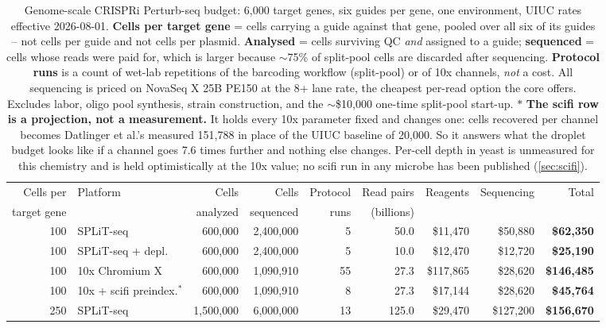 \begin{table}[htbp]\centering
\footnotesize
\caption[]{Genome-scale CRISPRi Perturb-seq budget: 6{,}000 target genes, six guides per gene, one environment, UIUC rates effective 2026-08-01. \textbf{Cells per target gene} = cells carrying a guide against that gene, pooled over all six of its guides -- not cells per guide and not cells per plasmid. \textbf{Analysed} = cells surviving QC \emph{and} assigned to a guide; \textbf{sequenced} = cells whose reads were paid for, which is larger because $\sim$75\% of split-pool cells are discarded after sequencing. \textbf{Protocol runs} is a count of wet-lab repetitions of the barcoding workflow (split-pool) or of 10x channels, \emph{not} a cost. All sequencing is priced on NovaSeq X 25B PE150 at the 8+ lane rate, the cheapest per-read option the core offers. Excludes labor, oligo pool synthesis, strain construction, and the $\sim$\$10{,}000 one-time split-pool start-up. $\ast$ \textbf{The scifi row is a projection, not a measurement.} It holds every 10x parameter fixed and changes one: cells recovered per channel becomes Datlinger et al.'s measured 151{,}788 in place of the UIUC baseline of 20{,}000. So it answers what the droplet budget looks like if a channel goes 7.6 times further and nothing else changes. Per-cell depth in yeast is unmeasured for this chemistry and is held optimistically at the 10x value; no scifi run in any microbe has been published (\cref{sec:scifi}).}\label{tab:budgets}
\begin{tabular}{rlrrrrrrr}
\toprule
Cells per & Platform & Cells & Cells & Protocol & Read pairs & Reagents & Sequencing & Total \\
target gene & & analyzed & sequenced & runs & (billions) & & & \\
\midrule
100 & SPLiT-seq & 600{,}000 & 2{,}400{,}000 & 5 & 50.0 & \$11{,}470 & \$50{,}880 & \textbf{\$62{,}350} \\
100 & SPLiT-seq + depl. & 600{,}000 & 2{,}400{,}000 & 5 & 10.0 & \$12{,}470 & \$12{,}720 & \textbf{\$25{,}190} \\
100 & 10x Chromium X & 600{,}000 & 1{,}090{,}910 & 55 & 27.3 & \$117{,}865 & \$28{,}620 & \textbf{\$146{,}485} \\
100 & 10x + scifi preindex.$^{\ast}$ & 600{,}000 & 1{,}090{,}910 & 8 & 27.3 & \$17{,}144 & \$28{,}620 & \textbf{\$45{,}764} \\
250 & SPLiT-seq & 1{,}500{,}000 & 6{,}000{,}000 & 13 & 125.0 & \$29{,}470 & \$127{,}200 & \textbf{\$156{,}670} \\

\end{tabular}
\end{table}
